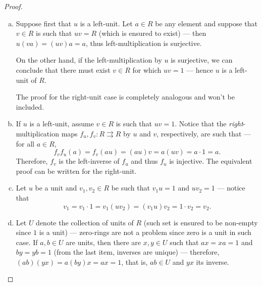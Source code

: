 %
\begin{proof}
    \begin{enumerate}[(a)]\setlength\itemsep{0em}
        \item Suppose first that \(u\) is a left-unit. Let \(a \in R\) be any element
              and suppose that \(v \in R\) is such that \(u v = R\) (which is ensured to
              exist) --- then \(u (v a) = (u v) a = a\), thus left-multiplication is
              surjective.

              On the other hand, if the left-multiplication by \(u\) is surjective, we can
              conclude that there must exist \(v \in R\) for which \(u v = 1\) --- hence
              \(u\) is a left-unit of \(R\).

              The proof for the right-unit case is completely analogous and won't be
              included.

        \item If \(u\) is a left-unit, assume \(v \in R\) is such that
              \(u v = 1\). Notice that the \emph{right}-multiplication maps
              \(f_u, f_v: R \rightrightarrows R\) by \(u\) and \(v\), respectively, are such
              that --- for all \(a \in R\),
              \[
                  f_v f_u(a) = f_v(a u) = (a u) v = a (u v) = a \cdot 1 = a.
              \]
              Therefore, \(f_v\) is the left-inverse of \(f_u\) and thus \(f_u\) is
              injective. The equivalent proof can be written for the right-unit.

        \item Let \(u\) be a unit and \(v_1, v_2 \in R\) be such that \(v_1 u = 1\) and
              \(u v_2 = 1\) --- notice that
              \[
                  v_1 = v_1 \cdot 1 = v_1 (u v_2) = (v_1 u) v_2 = 1 \cdot v_2 = v_2.
              \]


        \item Let \(U\) denote the collection of units of \(R\) (such set is ensured to
              be non-empty since \(1\) is a unit) --- zero-rings are not a problem since
              zero is a unit in such case. If \(a, b \in U\) are units, then there are
              \(x, y \in U\) such that \(a x = x a = 1\) and \(b y = y b = 1\) (from the
              last item, inverses are unique) --- therefore,
              \((a b) (y x) = a (b y) x = a x = 1\), that is, \(a b \in U\) and \(y x\)
              its inverse.
    \end{enumerate}
\end{proof}
%

